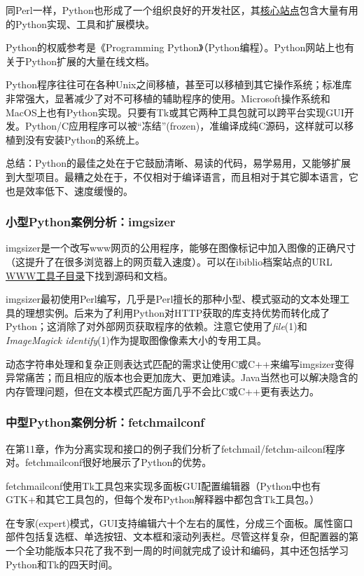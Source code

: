 \documentclass[12pt,oneside]{book}
\begin{document}
同Perl一样，Python也形成了一个组织良好的开发社区，其\href{http://www.python.org/}{核心站点}包含大量有用的Python实现、工具和扩展模块。

Python的权威参考是《Programming Python》（Python编程）\cite{Lutz}。Python网站上也有关于Python扩展的大量在线文档。

Python程序往往可在各种Unix之间移植，甚至可以移植到其它操作系统；标准库非常强大，显著减少了对不可移植的辅助程序的使用。Microsoft操作系统和MacOS上也有Python实现。只要有Tk或其它两种工具包就可以跨平台实现GUI开发。Python/C应用程序可以被“冻结”(frozen)，准编译成纯C源码，这样就可以移植到没有安装Python的系统上。

总结：Python的最佳之处在于它鼓励清晰、易读的代码，易学易用，又能够扩展到大型项目。最糟之处在于，不仅相对于编译语言，而且相对于其它脚本语言，它也是效率低下、速度缓慢的。

\subsubsection{小型Python案例分析：imgsizer}
imgsizer是一个改写www网页的公用程序，能够在图像标记中加入图像的正确尺寸（这提升了在很多浏览器上的网页载入速度）。可以在ibiblio档案站点的URL \href{http://www.ibiblio.org/}{WWW工具子目录}下找到源码和文档。

imgsizer最初使用Perl编写，几乎是Perl擅长的那种小型、模式驱动的文本处理工具的理想实例。后来为了利用Python对HTTP获取的库支持优势而转化成了Python；这消除了对外部网页获取程序的依赖。注意它使用了\textit{file}(1)和\textit{ImageMagick identify}(1)作为提取图像像素大小的专用工具。

动态字符串处理和复杂正则表达式匹配的需求让使用C或C++来编写imgsizer变得异常痛苦；而且相应的版本也会更加庞大、更加难读。Java当然也可以解决隐含的内存管理问题，但在文本模式匹配方面几乎不会比C或C++更有表达力。

\subsubsection{中型Python案例分析：fetchmailconf}
在第11章，作为分离实现和接口的例子我们分析了fetchmail/fetchm-ailconf程序对。fetchmailconf很好地展示了Python的优势。

fetchmailconf使用Tk工具包来实现多面板GUI配置编辑器（Python中也有GTK+和其它工具包的，但每个发布Python解释器中都包含Tk工具包。）

在专家(expert)模式，GUI支持编辑六十个左右的属性，分成三个面板。属性窗口部件包括复选框、单选按钮、文本框和滚动列表栏。尽管这样复杂，但配置器的第一个全功能版本只花了我不到一周的时间就完成了设计和编码，其中还包括学习Python和Tk的四天时间。
\end{document}
